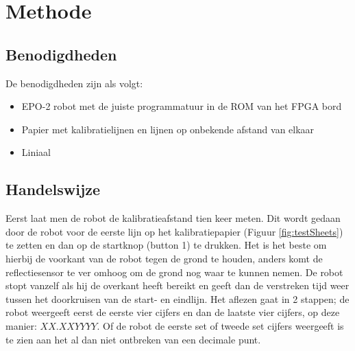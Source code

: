 \documentclass{report}
\begin{document}
\chapter{Methode}
\section{Benodigdheden}
De benodigdheden zijn als volgt:
\begin{itemize}
\item EPO-2 robot met de juiste programmatuur in de ROM van het FPGA bord
\item Papier met kalibratielijnen en lijnen op onbekende afstand van elkaar
\item Liniaal
\end{itemize}
\section{Handelswijze}
Eerst laat men de robot de kalibratieafstand tien keer meten. Dit wordt gedaan door de robot voor de eerste lijn op het kalibratiepapier (Figuur \ref{fig:testSheets}) te zetten en dan op de startknop (button 1) te drukken. Het is het beste om hierbij de voorkant van de robot tegen de grond te houden, anders komt de reflectiesensor te ver omhoog om de grond nog waar te kunnen nemen. De robot stopt vanzelf als hij de overkant heeft bereikt en geeft dan de verstreken tijd weer tussen het doorkruisen van de start- en eindlijn. Het aflezen gaat in 2 stappen; de robot weergeeft eerst de eerste vier cijfers en dan de laatste vier cijfers, op deze manier: $XX.XXYYYY$. Of de robot de eerste set of tweede set cijfers weergeeft is te zien aan het al dan niet ontbreken van een decimale punt. 
\end{document}
